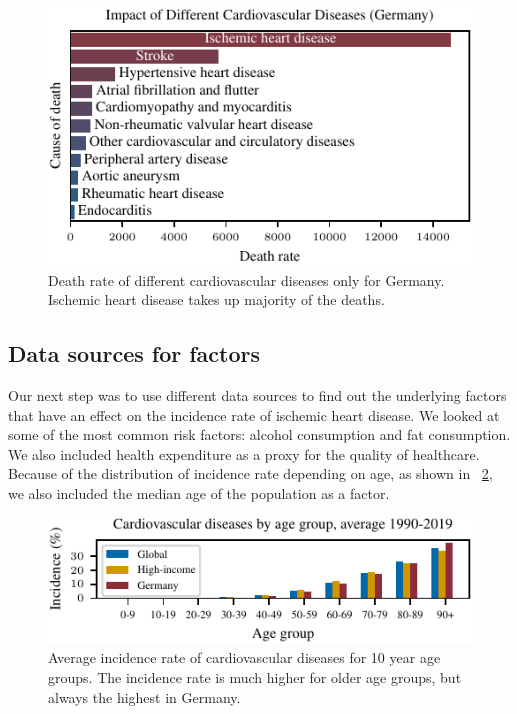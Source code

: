 \begin{figure}[ht]
    \vskip 0.2in
    \begin{center}
    \centerline{\includegraphics[width=\columnwidth]{fig/fig_ImpactOfDifferentCVDs.pdf}}
    \caption{Death rate of different cardiovascular diseases only for Germany. Ischemic heart disease takes up majority of the deaths.}
    \label{Impact of Different CVDs}
    \end{center}
    \vskip -0.2in
\end{figure}

\subsection{Data sources for factors}\label{sec:data_sources}

Our next step was to use different data sources to find out the underlying factors that have an effect on the incidence rate of ischemic heart disease. We looked at some of the most common risk factors: alcohol consumption and fat consumption. We also included health expenditure as a proxy for the quality of healthcare. Because of the 
distribution of incidence rate depending on age, as shown in \figurename~\ref{Cardiovascular diseases for age groups}, we also included the median age of the population as a factor.

\begin{figure}[ht]
    \vskip 0.2in
    \begin{center}
    \centerline{\includegraphics[width=\columnwidth]{fig/fig_cardiovascular_disease_agerange.pdf}}
    \caption{Average incidence rate of cardiovascular diseases for 10 year age groups. The incidence rate is much higher for older age groups, but 
    always the highest in Germany.}
    \label{Cardiovascular diseases for age groups}
    \end{center}
    \vskip -0.2in
\end{figure}

